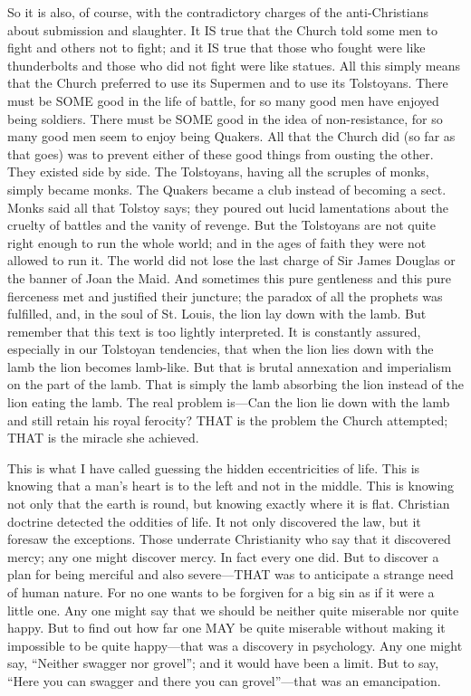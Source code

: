 So it is also, of course, with the contradictory charges of the anti-Christians about submission and slaughter. It IS true that the Church told some men to fight and others not to fight; and it IS true that those who fought were like thunderbolts and those who did not fight were like statues. All this simply means that the Church preferred to use its Supermen and to use its Tolstoyans. There must be SOME good in the life of battle, for so many good men have enjoyed being soldiers. There must be SOME good in the idea of non-resistance, for so many good men seem to enjoy being Quakers. All that the Church did (so far as that goes) was to prevent either of these good things from ousting the other. They existed side by side. The Tolstoyans, having all the scruples of monks, simply became monks. The Quakers became a club instead of becoming a sect. Monks said all that Tolstoy says; they poured out lucid lamentations about the cruelty of battles and the vanity of revenge. But the Tolstoyans are not quite right enough to run the whole world; and in the ages of faith they were not allowed to run it. The world did not lose the last charge of Sir James Douglas or the banner of Joan the Maid. And sometimes this pure gentleness and this pure fierceness met and justified their juncture; the paradox of all the prophets was fulfilled, and, in the soul of St. Louis, the lion lay down with the lamb. But remember that this text is too lightly interpreted. It is constantly assured, especially in our Tolstoyan tendencies, that when the lion lies down with the lamb the lion becomes lamb-like. But that is brutal annexation and imperialism on the part of the lamb. That is simply the lamb absorbing the lion instead of the lion eating the lamb. The real problem is—Can the lion lie down with the lamb and still retain his royal ferocity? THAT is the problem the Church attempted; THAT is the miracle she achieved.

This is what I have called guessing the hidden eccentricities of life. This is knowing that a man’s heart is to the left and not in the middle. This is knowing not only that the earth is round, but knowing exactly where it is flat. Christian doctrine detected the oddities of life. It not only discovered the law, but it foresaw the exceptions. Those underrate Christianity who say that it discovered mercy; any one might discover mercy. In fact every one did. But to discover a plan for being merciful and also severe—THAT was to anticipate a strange need of human nature. For no one wants to be forgiven for a big sin as if it were a little one. Any one might say that we should be neither quite miserable nor quite happy. But to find out how far one MAY be quite miserable without making it impossible to be quite happy—that was a discovery in psychology. Any one might say, “Neither swagger nor grovel”; and it would have been a limit. But to say, “Here you can swagger and there you can grovel”—that was an emancipation.

